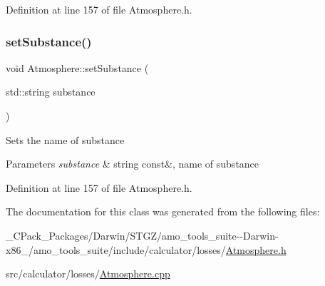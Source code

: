 Definition at line 157 of file Atmosphere.\+h.

\mbox{\label{class_atmosphere_aa92f55a1f07304f3e57fdfb8ece65d82}} 
\subsubsection{\texorpdfstring{set\+Substance()}{setSubstance()}\hspace{0.1cm}{\footnotesize\ttfamily [3/3]}}
{\footnotesize\ttfamily void Atmosphere\+::set\+Substance (\begin{DoxyParamCaption}\item[{std\+::string}]{substance }\end{DoxyParamCaption})\hspace{0.3cm}{\ttfamily [inline]}}

Sets the name of substance 
\begin{DoxyParams}{Parameters}
{\em substance} & string const\&, name of substance \\
\hline
\end{DoxyParams}


Definition at line 157 of file Atmosphere.\+h.



The documentation for this class was generated from the following files\+:\begin{DoxyCompactItemize}
\item 
\+\_\+\+C\+Pack\+\_\+\+Packages/\+Darwin/\+S\+T\+G\+Z/amo\+\_\+tools\+\_\+suite-\/-\/\+Darwin-\/x86\+\_/amo\+\_\+tools\+\_\+suite/include/calculator/losses/\hyperlink{___c_pack___packages_2_darwin_2_s_t_g_z_2amo__tools__suite--_darwin-x86__64_2amo__tools__suite_2e55e6468306d671528be79ed436ba8db}{Atmosphere.\+h}\item 
src/calculator/losses/\hyperlink{_atmosphere_8cpp}{Atmosphere.\+cpp}\end{DoxyCompactItemize}
